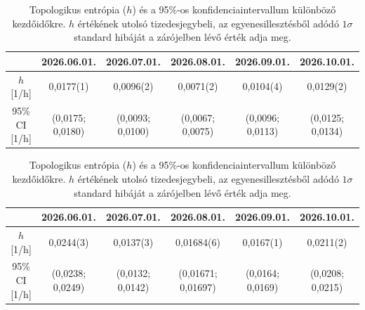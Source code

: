 \documentclass[12pt,a4paper]{article}
\begin{document}
\begin{table}[H]
    \centering
    \footnotesize
    \begin{subtable}{\textwidth}
        \centering
        \begin{tabular}{|c|c|c|c|c|c|}\hline
            & \textbf{2026.06.01.} & \textbf{2026.07.01.} & \textbf{2026.08.01.} & \textbf{2026.09.01.} & \textbf{2026.10.01.} \\\hline
            $h$ [1/h] & 0,0177(1) & 0,0096(2) & 0,0071(2) & 0,0104(4) & 0,0129(2) \\\hline
            95\% CI [1/h] & (0,0175; 0,0180) & (0,0093; 0,0100) & (0,0067; 0,0075) & (0,0096; 0,0113) & (0,0125; 0,0134) \\\hline
        \end{tabular}
        \caption{AIFS}
    \end{subtable}

    \vspace{0.6cm}

    \begin{subtable}{\textwidth}
        \centering
        \begin{tabular}{|c|c|c|c|c|c|}\hline
            & \textbf{2026.06.01.} & \textbf{2026.07.01.} & \textbf{2026.08.01.} & \textbf{2026.09.01.} & \textbf{2026.10.01.} \\\hline
            $h$ [1/h] & 0,0244(3) & 0,0137(3) & 0,01684(6) & 0,0167(1) & 0,0211(2) \\\hline
            95\% CI [1/h] & (0,0238; 0,0249) & (0,0132; 0,0142) & (0,01671; 0,01697) & (0,0164; 0,0169) & (0,0208; 0,0215) \\\hline
        \end{tabular}
        \caption{IFS}
    \end{subtable}
    \caption{Topologikus entrópia ($h$) és a 95\%-os konfidenciaintervallum különböző kezdőidőkre. $h$ értékének utolsó tizedesjegybeli, az egyenesillesztésből adódó $1 \sigma$ standard hibáját a zárójelben lévő érték adja meg.}
    \label{tab:trade700_top}
\end{table}
\end{document}
